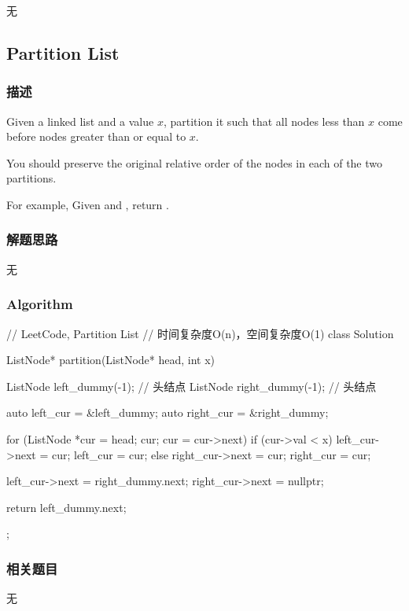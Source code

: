 \begindot
\item 无
\myenddot


\subsection{Partition List}
\label{sec:partition-list}


\subsubsection{描述}
Given a linked list and a value $x$, partition it such that all nodes less than 
$x$ come before nodes greater than or equal to $x$.

You should preserve the original relative order of the nodes in each of the two 
partitions.

For example,
Given  and , return .


\subsubsection{解题思路}
无


\subsubsection{Algorithm}
\begin{Code}
	// LeetCode, Partition List
	// 时间复杂度O(n)，空间复杂度O(1)
	class Solution {
		ListNode* partition(ListNode* head, int x) {
			ListNode left_dummy(-1); // 头结点
			ListNode right_dummy(-1); // 头结点
			
			auto left_cur = &left_dummy;
			auto right_cur = &right_dummy;
			
			for (ListNode *cur = head; cur; cur = cur->next) {
				if (cur->val < x) {
					left_cur->next = cur;
					left_cur = cur;
				} else {
					right_cur->next = cur;
					right_cur = cur;
				}
			}
		
			left_cur->next = right_dummy.next;
			right_cur->next = nullptr;
		
			return left_dummy.next;
		}
	};
\end{Code}


\subsubsection{相关题目}

\begindot
\item 无
\myenddot



